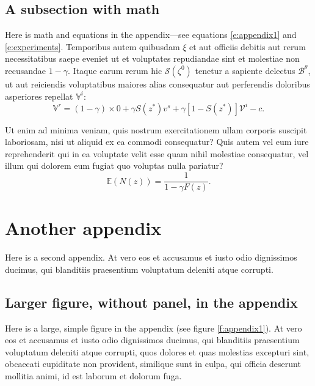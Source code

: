 \documentclass[letterpaper,11pt,leqno]{article}
\begin{document}
\subsection{A subsection with math}

Here is math and equations in the appendix---see equations \eqref{e:appendix1} and \eqref{e:experiments}. Temporibus autem quibusdam $\xi$ et aut officiis debitis aut rerum necessitatibus saepe eveniet ut et voluptates repudiandae sint et molestiae non recusandae $1-\gamma$. Itaque earum rerum hic $\mathcal{S}(\zeta^0)$ tenetur a sapiente delectus $\mathcal{B}^\theta$, ut aut reiciendis voluptatibus maiores alias consequatur aut perferendis doloribus asperiores repellat $\mathbb{V}^i$:
\begin{equation}
\mathbb{V}^r = (1-\gamma) \times 0 +\gamma S(z^*) v^s+\gamma [1-S(z^*)] \mathcal{V}^i-c.
\label{e:appendix1}\end{equation}

Ut enim ad minima veniam, quis nostrum exercitationem ullam corporis suscipit laboriosam, nisi ut aliquid ex ea commodi consequatur? Quis autem vel eum iure reprehenderit qui in ea voluptate velit esse quam nihil molestiae consequatur, vel illum qui dolorem eum fugiat quo voluptas nulla pariatur? 
\begin{equation}
\mathbb{E}(N(z)) = \frac{1}{1-\gamma F(z)}.
\label{e:experiments}\end{equation}

\section{Another appendix}\label{a:appendix2}

Here is a second appendix. At vero eos et accusamus et iusto odio dignissimos ducimus, qui blanditiis praesentium voluptatum deleniti atque corrupti.

\subsection{Larger figure, without panel, in the appendix} 

Here is a large, simple figure in the appendix (see figure \ref{f:appendix1}). At vero eos et accusamus et iusto odio dignissimos ducimus, qui blanditiis praesentium voluptatum deleniti atque corrupti, quos dolores et quas molestias excepturi sint, obcaecati cupiditate non provident, similique sunt in culpa, qui officia deserunt mollitia animi, id est laborum et dolorum fuga.
\end{document}
